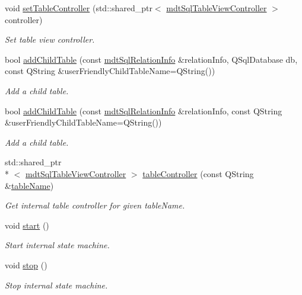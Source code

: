 \begin{DoxyCompactItemize}
void \hyperlink{classmdt_sql_table_widget_a4855a76905a856cfe82d3ca3f969f17a}{set\-Table\-Controller} (std\-::shared\-\_\-ptr$<$ \hyperlink{classmdt_sql_table_view_controller}{mdt\-Sql\-Table\-View\-Controller} $>$ controller)
\begin{DoxyCompactList}\small\item\em Set table view controller. \end{DoxyCompactList}\item 
bool \hyperlink{classmdt_sql_table_widget_a2a12dbb0c50177aca0ac57edea6af18d}{add\-Child\-Table} (const \hyperlink{classmdt_sql_relation_info}{mdt\-Sql\-Relation\-Info} \&relation\-Info, Q\-Sql\-Database db, const Q\-String \&user\-Friendly\-Child\-Table\-Name=Q\-String())
\begin{DoxyCompactList}\small\item\em Add a child table. \end{DoxyCompactList}\item 
bool \hyperlink{classmdt_sql_table_widget_ae80d69e391c277b7e4563aea2b1c92d6}{add\-Child\-Table} (const \hyperlink{classmdt_sql_relation_info}{mdt\-Sql\-Relation\-Info} \&relation\-Info, const Q\-String \&user\-Friendly\-Child\-Table\-Name=Q\-String())
\begin{DoxyCompactList}\small\item\em Add a child table. \end{DoxyCompactList}\item 
std\-::shared\-\_\-ptr\\*
$<$ \hyperlink{classmdt_sql_table_view_controller}{mdt\-Sql\-Table\-View\-Controller} $>$ \hyperlink{classmdt_sql_table_widget_a3fdef8f8a617da5d93460f328d5a38fb}{table\-Controller} (const Q\-String \&\hyperlink{classmdt_sql_table_widget_a5ebff43d17810531de12c7c3eb208a85}{table\-Name})
\begin{DoxyCompactList}\small\item\em Get internal table controller for given table\-Name. \end{DoxyCompactList}\item 
void \hyperlink{classmdt_sql_table_widget_abfab2f8ad93b0efdb41dd23007db0bbb}{start} ()
\begin{DoxyCompactList}\small\item\em Start internal state machine. \end{DoxyCompactList}\item 
void \hyperlink{classmdt_sql_table_widget_a071ab9cd7de514a8ba4341234fefce64}{stop} ()
\begin{DoxyCompactList}\small\item\em Stop internal state machine. \end{DoxyCompactList}\item 

\end{DoxyCompactItemize}

